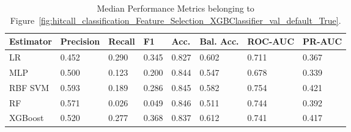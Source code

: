 \begin{longtable}{llllllll}
\caption{Median Performance Metrics belonging to Figure~\ref{fig:hitcall_classification_Feature_Selection_XGBClassifier_val_default_True}.}\label{tab:table:hitcall_classification_feature_selection_xgbclassifier_val_default_true}\\
\toprule
\midrule
\small Estimator & \small Precision & \small Recall & \small F1 & \small Acc. & \small Bal. Acc. & \small ROC-AUC & \small PR-AUC\\
\hline
LR & 0.452 & 0.290 & 0.345 & 0.827 & 0.602 & 0.711 & 0.367\\
MLP & 0.500 & 0.123 & 0.200 & 0.844 & 0.547 & 0.678 & 0.339\\
RBF SVM & 0.593 & 0.189 & 0.286 & 0.845 & 0.582 & 0.754 & 0.421\\
RF & 0.571 & 0.026 & 0.049 & 0.846 & 0.511 & 0.744 & 0.392\\
XGBoost & 0.520 & 0.277 & 0.368 & 0.837 & 0.612 & 0.741 & 0.417\\
\bottomrule
\end{longtable}